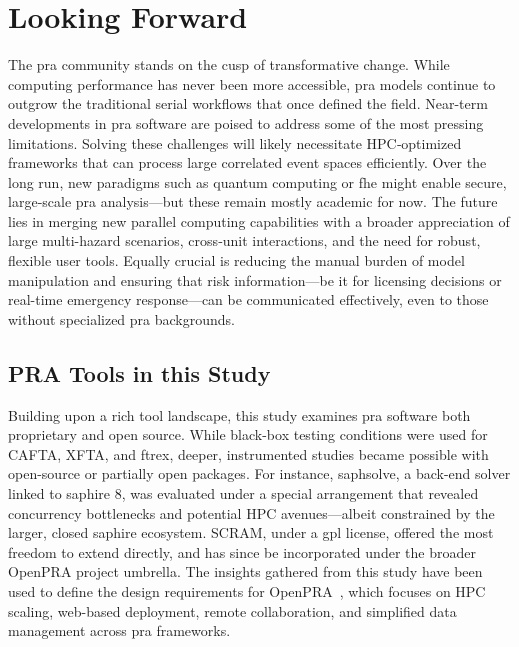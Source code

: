 \section{Looking Forward}
The \acrshort{pra} community stands on the cusp of transformative change. While computing performance has never been more accessible, \acrshort{pra} models continue to outgrow the traditional serial workflows that once defined the field. Near-term developments in \acrshort{pra} software are poised to address some of the most pressing limitations. Solving these challenges will likely necessitate HPC‐optimized frameworks that can process large correlated event spaces efficiently. Over the long run, new paradigms such as quantum computing or \acrfull{fhe} might enable secure, large‐scale \acrshort{pra} analysis—but these remain mostly academic for now. The future lies in merging new parallel computing capabilities with a broader appreciation of large multi-hazard scenarios, cross‐unit interactions, and the need for robust, flexible user tools. Equally crucial is reducing the manual burden of model manipulation and ensuring that risk information—be it for licensing decisions or real-time emergency response—can be communicated effectively, even to those without specialized \acrshort{pra} backgrounds.

\subsection{PRA Tools in this Study}

Building upon a rich tool landscape, this study examines \acrshort{pra} software both proprietary and open source. While black-box testing conditions were used for CAFTA, XFTA, and \acrshort{ftrex}, deeper, instrumented studies became possible with open-source or partially open packages. For instance, \acrshort{saphsolve}, a back-end solver linked to \acrshort{saphire} 8, was evaluated under a special arrangement that revealed concurrency bottlenecks and potential HPC avenues—albeit constrained by the larger, closed \acrshort{saphire} ecosystem. SCRAM, under a \acrshort{gpl} license, offered the most freedom to extend directly, and has since be incorporated under the broader OpenPRA project umbrella. The insights gathered from this study have been used to define the design requirements for OpenPRA~\cite{openpra_initiative_openpra_2024}, which focuses on HPC scaling, web-based deployment, remote collaboration, and simplified data management across \acrshort{pra} frameworks.



